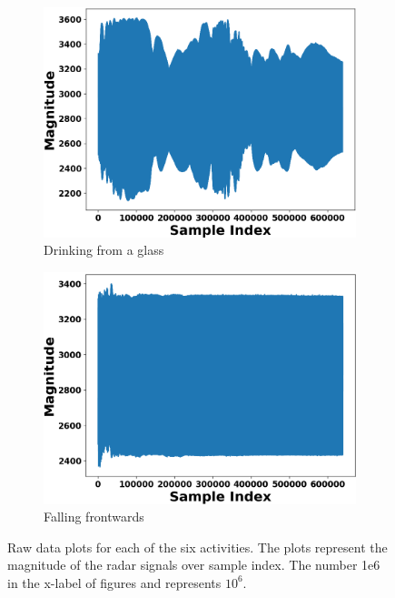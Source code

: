 \documentclass{l4proj}
\begin{document}
\begin{appendices}
\begin{figure}[h]
\begin{subfigure}[b]{0.32\textwidth}
        \includegraphics[width=\textwidth]{images/raw_data5.png}
        \caption{Drinking from a glass}
        \label{fig:raw_data5}
    \end{subfigure}
    \hfill
    \begin{subfigure}[b]{0.32\textwidth}
        \includegraphics[width=\textwidth]{images/raw_data6.png}
        \caption{Falling frontwards}
        \label{fig:raw_data6}
    \end{subfigure}
  \caption{Raw data plots for each of the six activities. The plots represent the magnitude of the radar signals over sample index. The number 1e6 in the x-label of figures  and  represents ${10^6}$.}
  \label{fig:raw_data_plots}
\end{figure}


\end{appendices}
\end{document}

